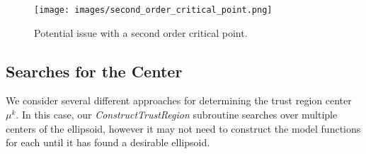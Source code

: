 \begin{figure}[h]
    \centering
    \texttt{[image: images/second\_order\_critical\_point.png]}
    \caption{Potential issue with a second order critical point.}
    \label{fbns}
\end{figure}





\subsection{Searches for the Center}

We consider several different approaches for determining the trust region center $\mu^k$.
In this case, our \emph{ConstructTrustRegion} subroutine searches over multiple centers of the ellipsoid, however it may not need to construct the model functions for each until it has found a desirable ellipsoid.






%            


